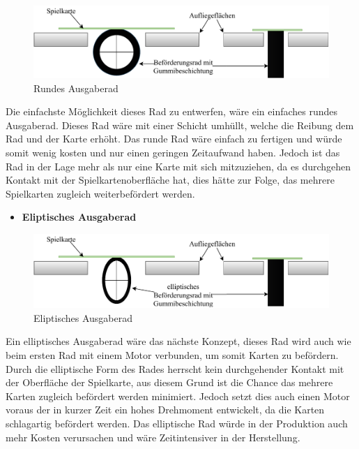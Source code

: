 \begin{figure}[H]
    \centering
    \includegraphics[scale=0.9,page=1]{fig/mech/RundesAusgaberad-Page-1}
    \caption{Rundes Ausgaberad}
\end{figure}

Die einfachste Möglichkeit dieses Rad zu entwerfen, wäre ein einfaches rundes Ausgaberad. Dieses Rad wäre mit einer Schicht umhüllt, welche die Reibung
dem Rad und der Karte erhöht. Das runde Rad wäre einfach zu fertigen und würde somit wenig kosten und nur einen geringen Zeitaufwand haben. Jedoch
ist das Rad in der Lage mehr als nur eine Karte mit sich mitzuziehen, da es durchgehen Kontakt mit der Spielkartenoberfläche hat, dies hätte zur
Folge, das mehrere Spielkarten zugleich weiterbefördert werden.
\begin{itemize}
    \item \textbf{Eliptisches Ausgaberad}
\end{itemize}

\begin{figure}[H]
    \centering
    \includegraphics[scale=0.9,page=1]{fig/mech/ElliptischesAusgaberad}
    \caption{Eliptisches Ausgaberad}
\end{figure}


Ein elliptisches Ausgaberad wäre das nächste Konzept, dieses Rad wird auch wie beim ersten Rad mit einem Motor verbunden, um somit Karten zu befördern.
Durch die elliptische Form des Rades herrscht kein durchgehender Kontakt mit der Oberfläche der Spielkarte, aus diesem Grund ist die Chance das mehrere
Karten zugleich befördert werden minimiert. Jedoch setzt dies auch einen Motor voraus der in kurzer Zeit ein hohes Drehmoment entwickelt, da die
Karten schlagartig befördert werden. Das elliptische Rad würde in der Produktion auch mehr Kosten verursachen und wäre Zeitintensiver in der Herstellung. \\

